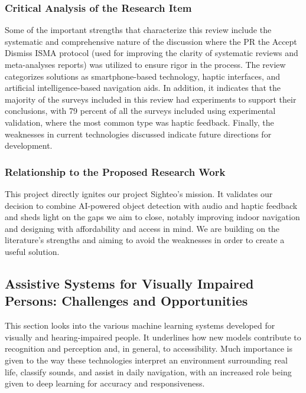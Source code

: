 \documentclass{FastFyp}
\begin{document}
\subsubsection{Critical Analysis of the Research Item} 
Some of the important strengths that characterize this review include the systematic and comprehensive nature of the discussion where the PR the Accept Dismiss ISMA protocol (used for improving the clarity of systematic reviews and meta-analyses reports) was utilized to ensure rigor in the process. The review categorizes solutions as smartphone-based technology, haptic interfaces, and artificial intelligence-based navigation aids. In addition, it indicates that the majority of the surveys included in this review had experiments to support their conclusions, with 79 percent of all the surveys included using experimental validation, where the most common type was haptic feedback. Finally, the weaknesses in current technologies discussed indicate future directions for development.

\subsubsection{Relationship to the Proposed Research Work}  
This project directly ignites our project Sighteo's mission. It validates our decision to combine AI-powered object detection with audio and haptic feedback and sheds light on the gaps we aim to close, notably improving indoor navigation and designing with affordability and access in mind. We are building on the literature's strengths and aiming to avoid the weaknesses in order to create a useful solution.

\subsection{Assistive Systems for Visually Impaired Persons: Challenges and Opportunities}
This section looks into the various machine learning systems developed for visually and hearing-impaired people. It underlines how new models contribute to recognition and perception and, in general, to accessibility. Much importance is given to the way these technologies interpret an environment surrounding real life, classify sounds, and assist in daily navigation, with an increased role being given to deep learning for accuracy and responsiveness.
\end{document}
